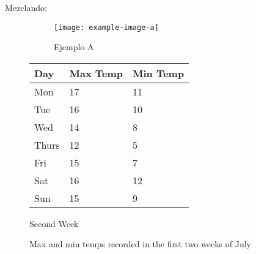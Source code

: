 \documentclass [15pt,a4paper]{article}
\begin{document}
Mezclando:

\begin{figure}[H]
     \centering
     \begin{subfigure}{0.3\textwidth}
         \centering
         \texttt{[image: example-image-a]}
         \caption{Ejemplo A}
         \label{fig:figura}
     \end{subfigure}
    \begin{subtable}{0.45\textwidth}
        \centering
        \begin{tabular}{l | l | l}
        Day & Max Temp & Min Temp \\
        \hline \hline
        Mon & 17 & 11\\
        Tue & 16 & 10\\
        Wed & 14 & 8\\
        Thurs & 12 & 5\\
        Fri & 15 & 7\\
        Sat & 16 & 12\\
        Sun & 15 & 9
        \end{tabular}
        \caption{Second Week}
        \label{tab:tabla}
     \end{subtable}
     \caption{Max and min temps recorded in the first two weeks of July}
     \label{figs:mezcla}
\end{figure}
\end{document}
